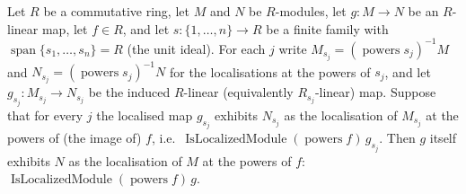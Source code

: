 \begin{lemma}
  \label{lem:isLocalizedModule_of_span_cover}
  Let \(R\) be a commutative ring, let \(M\) and \(N\) be \(R\)-modules, let
  \(g : M \to N\) be an \(R\)-linear map, let \(f \in R\), and let
  \(s : \{1, \ldots, n\} \to R\) be a finite family with
  \(\operatorname{span}\{s_1, \ldots, s_n\} = R\) (the unit ideal). For each \(j\) write
  \(M_{s_j} = (\operatorname{powers} s_j)^{-1} M\) and \(N_{s_j} = (\operatorname{powers}
  s_j)^{-1} N\) for the localisations at the powers of \(s_j\), and let
  \(g_{s_j} : M_{s_j} \to N_{s_j}\) be the induced \(R\)-linear (equivalently
  \(R_{s_j}\)-linear) map. Suppose that for every \(j\) the localised map \(g_{s_j}\)
  exhibits \(N_{s_j}\) as the localisation of \(M_{s_j}\) at the powers of (the image of)
  \(f\), i.e.\ \(\operatorname{IsLocalizedModule}(\operatorname{powers} f)\, g_{s_j}\). Then
  \(g\) itself exhibits \(N\) as the localisation of \(M\) at the powers of \(f\):
  \(\operatorname{IsLocalizedModule}(\operatorname{powers} f)\, g\).
\end{lemma}
